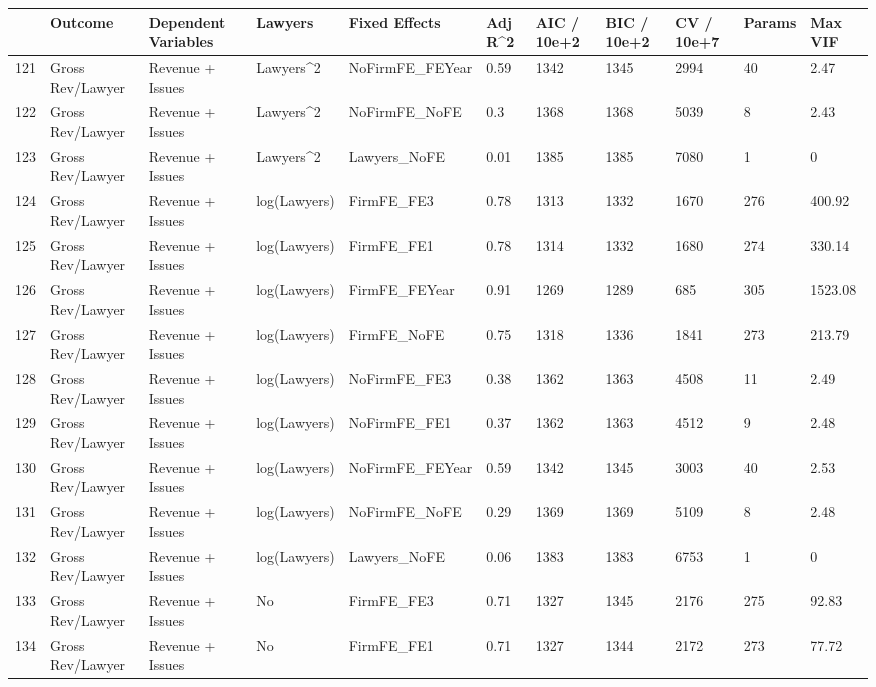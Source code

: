 \begin{table}[ht]
\centering
\begin{tabular}{rllllllllll}
  \hline
 & Outcome & Dependent Variables & Lawyers & Fixed Effects & Adj R^2 & AIC / 10e+2 & BIC / 10e+2 & CV / 10e+7 & Params & Max VIF \\ 
  \hline
121 & Gross Rev/Lawyer & Revenue + Issues & Lawyers^2 & NoFirmFE\_FEYear & 0.59 & 1342 & 1345 & 2994 & 40 & 2.47 \\ 
  122 & Gross Rev/Lawyer & Revenue + Issues & Lawyers^2 & NoFirmFE\_NoFE & 0.3 & 1368 & 1368 & 5039 & 8 & 2.43 \\ 
  123 & Gross Rev/Lawyer & Revenue + Issues & Lawyers^2 & Lawyers\_NoFE & 0.01 & 1385 & 1385 & 7080 & 1 & 0 \\ 
  124 & Gross Rev/Lawyer & Revenue + Issues & log(Lawyers) & FirmFE\_FE3 & 0.78 & 1313 & 1332 & 1670 & 276 & 400.92 \\ 
  125 & Gross Rev/Lawyer & Revenue + Issues & log(Lawyers) & FirmFE\_FE1 & 0.78 & 1314 & 1332 & 1680 & 274 & 330.14 \\ 
  126 & Gross Rev/Lawyer & Revenue + Issues & log(Lawyers) & FirmFE\_FEYear & 0.91 & 1269 & 1289 & 685 & 305 & 1523.08 \\ 
  127 & Gross Rev/Lawyer & Revenue + Issues & log(Lawyers) & FirmFE\_NoFE & 0.75 & 1318 & 1336 & 1841 & 273 & 213.79 \\ 
  128 & Gross Rev/Lawyer & Revenue + Issues & log(Lawyers) & NoFirmFE\_FE3 & 0.38 & 1362 & 1363 & 4508 & 11 & 2.49 \\ 
  129 & Gross Rev/Lawyer & Revenue + Issues & log(Lawyers) & NoFirmFE\_FE1 & 0.37 & 1362 & 1363 & 4512 & 9 & 2.48 \\ 
  130 & Gross Rev/Lawyer & Revenue + Issues & log(Lawyers) & NoFirmFE\_FEYear & 0.59 & 1342 & 1345 & 3003 & 40 & 2.53 \\ 
  131 & Gross Rev/Lawyer & Revenue + Issues & log(Lawyers) & NoFirmFE\_NoFE & 0.29 & 1369 & 1369 & 5109 & 8 & 2.48 \\ 
  132 & Gross Rev/Lawyer & Revenue + Issues & log(Lawyers) & Lawyers\_NoFE & 0.06 & 1383 & 1383 & 6753 & 1 & 0 \\ 
  133 & Gross Rev/Lawyer & Revenue + Issues & No & FirmFE\_FE3 & 0.71 & 1327 & 1345 & 2176 & 275 & 92.83 \\ 
  134 & Gross Rev/Lawyer & Revenue + Issues & No & FirmFE\_FE1 & 0.71 & 1327 & 1344 & 2172 & 273 & 77.72 \\ 

\end{tabular}
\end{table}
